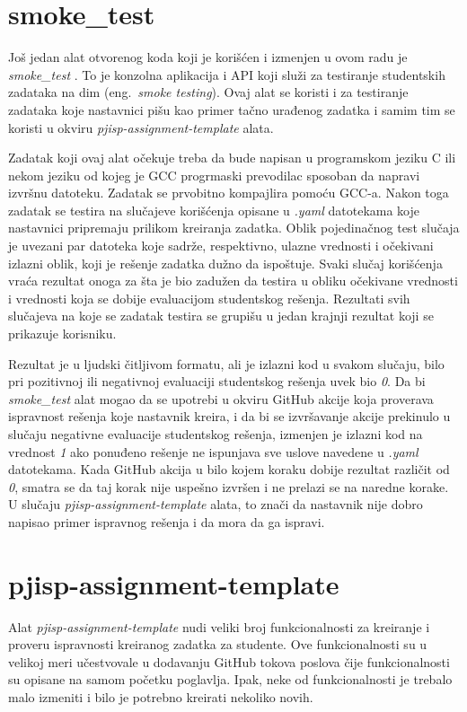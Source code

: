 \documentclass[12pt]{report}
\begin{document}
\section{smoke\_test}
Još jedan alat otvorenog koda koji je korišćen i izmenjen u ovom radu je \textit{smoke\_test} \cite{smoke-test}. To je konzolna aplikacija i API koji služi za testiranje studentskih zadataka na dim (eng.\ \textit{smoke testing}). Ovaj alat se koristi i za testiranje zadataka koje nastavnici pišu kao primer tačno urađenog zadatka i samim tim se koristi u okviru \textit{pjisp-assignment-template} alata.

Zadatak koji ovaj alat očekuje treba da bude napisan u programskom jeziku C ili nekom jeziku od kojeg je GCC progrmaski prevodilac sposoban da napravi izvršnu datoteku. Zadatak se prvobitno kompajlira pomoću GCC-a. Nakon toga zadatak se testira na slučajeve korišćenja opisane u \textit{.yaml} datotekama koje nastavnici pripremaju prilikom kreiranja zadatka. Oblik pojedinačnog test slučaja je uvezani par datoteka koje sadrže, respektivno, ulazne vrednosti i očekivani izlazni oblik, koji je rešenje zadatka dužno da ispoštuje. Svaki slučaj korišćenja vraća rezultat onoga za šta je bio zadužen da testira u obliku očekivane vrednosti i vrednosti koja se dobije evaluacijom studentskog rešenja. Rezultati svih slučajeva na koje se zadatak testira se grupišu u jedan krajnji rezultat koji se prikazuje korisniku.

Rezultat je u ljudski čitljivom formatu, ali je izlazni kod u svakom slučaju, bilo pri pozitivnoj ili negativnoj evaluaciji studentskog rešenja uvek bio \textit{0}. Da bi \textit{smoke\_test} alat mogao da se upotrebi u okviru GitHub akcije koja proverava ispravnost rešenja koje nastavnik kreira, i da bi se izvršavanje akcije prekinulo u slučaju negativne evaluacije studentskog rešenja, izmenjen je izlazni kod na vrednost \textit{1} ako ponuđeno rešenje ne ispunjava sve uslove navedene u \textit{.yaml} datotekama. Kada GitHub akcija u bilo kojem koraku dobije rezultat različit od \textit{0}, smatra se da taj korak nije uspešno izvršen i ne prelazi se na naredne korake. U slučaju \textit{pjisp-assignment-template} alata, to znači da nastavnik nije dobro napisao primer ispravnog rešenja i da mora da ga ispravi.

\section{pjisp-assignment-template}
Alat \textit{pjisp-assignment-template} nudi veliki broj funkcionalnosti za kreiranje i proveru ispravnosti kreiranog zadatka za studente. Ove funkcionalnosti su u velikoj meri učestvovale u dodavanju GitHub tokova poslova čije funkcionalnosti su opisane na samom početku poglavlja. Ipak, neke od funkcionalnosti je trebalo malo izmeniti i bilo je potrebno kreirati nekoliko novih.
\end{document}
